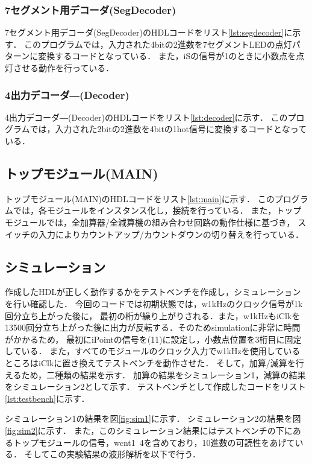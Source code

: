 \documentclass[a4paper,11pt]{ltjsarticle}
\begin{document}
\subsubsection{7セグメント用デコーダ(SegDecoder)}
7セグメント用デコーダ(SegDecoder)のHDLコードをリスト\ref{lst:segdecoder}に示す．
このプログラムでは，入力された4bitの2進数を7セグメントLEDの点灯パターンに変換するコードとなっている．
また，iSの信号が1のときに小数点を点灯させる動作を行っている．

\subsubsection{4出力デコーダ―(Decoder)}
4出力デコーダ―(Decoder)のHDLコードをリスト\ref{lst:decoder}に示す．
このプログラムでは，入力された2bitの2進数を4bitの1hot信号に変換するコードとなっている．

\subsection{トップモジュール(MAIN)}
トップモジュール(MAIN)のHDLコードをリスト\ref{lst:main}に示す．
このプログラムでは，各モジュールをインスタンス化し，接続を行っている．
また，トップモジュールでは，全加算器/全減算機の組み合わせ回路の動作仕様に基づき，
スイッチの入力によりカウントアップ/カウントダウンの切り替えを行っている．

\subsection{シミュレーション}
作成したHDLが正しく動作するかをテストベンチを作成し，シミュレーションを行い確認した．
今回のコードでは初期状態では，w1kHzのクロック信号が1k回分立ち上がった後に，
最初の桁が繰り上がりされる．また，w1kHzもiClkを13500回分立ち上がった後に出力が反転する．そのためsimulationに非常に時間がかかるため，
最初にiPointの信号を(11)に設定し，小数点位置を3桁目に固定している．
また，すべてのモジュールのクロック入力でw1kHzを使用しているところはiClkに置き換えてテストベンチを動作させた．
そして，加算/減算を行えるため，二種類の結果を示す．
加算の結果をシミュレーション1，減算の結果をシミュレーション2として示す．
テストベンチとして作成したコードをリスト\ref{lst:testbench}に示す．

シミュレーション1の結果を図\ref{fig:sim1}に示す．
シミュレーション2の結果を図\ref{fig:sim2}に示す．
また，このシミュレーション結果にはテストベンチの下にあるトップモジュールの信号，wcnt1~4を含めており，10進数の可読性をあげている．
そしてこの実験結果の波形解析を以下で行う．
\end{document}
